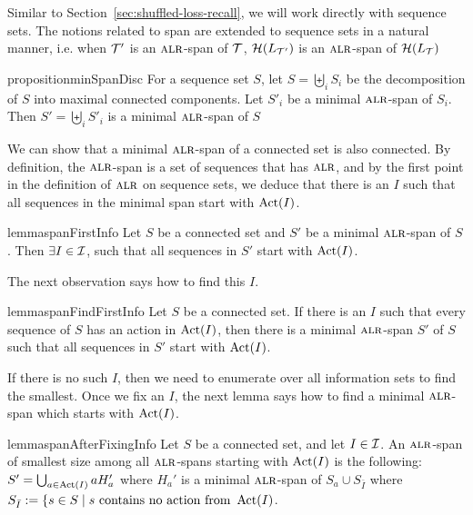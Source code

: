 Similar to Section~\ref{sec:shuffled-loss-recall}, we will work
directly with sequence sets. The notions related to span are extended
to sequence sets in a natural manner, i.e. when $\mathcal{T}'$ is an
$\textsc{alr}$-span of $\mathcal{T}$, $\mathcal{H}(L_{\mathcal{T}'})$ is an $\textsc{alr}$-span of
$\mathcal{H}(L_{\mathcal{T}})$  

\begin{restatable}{proposition}{minSpanDisc}\label{prop:min-span-disconnected}
  For a sequence set $S$, let $S = \biguplus_{i}S_i$ be the
  decomposition of $S$ into maximal connected components. Let $S'_i$
  be a minimal $\textsc{alr}$-span of $S_i$. Then
  $S' = \biguplus_{i}S'_i$ is a minimal $\textsc{alr}$-span of $S$
\end{restatable}

We can show that a minimal $\textsc{alr}$-span of a connected set is also
connected. By definition, the $\textsc{alr}$-span is a set of sequences that
has $\textsc{alr}$, and by the first point in the definition of $\textsc{alr}$ on
sequence sets, we deduce that there is an $I$ such that all sequences
in the minimal span start with $\operatorname{Act}(I)$.

\begin{restatable}{lemma}{spanFirstInfo}\label{lem:span-first-I}
  Let $S$ be a connected set and $S'$ be a minimal $\textsc{alr}$-span of
  $S$. Then $\exists I \in \mathcal{I}$, such that all sequences in $S'$ start
  with $\operatorname{Act}(I)$.
\end{restatable}


The next observation says how to find this $I$. 
\begin{restatable}{lemma}{spanFindFirstInfo}\label{lem:span-finding-first-I}
  Let $S$ be a connected set. If there is an $I$ such that every
  sequence of $S$ has an action in $\operatorname{Act}(I)$, then there is a minimal
  $\textsc{alr}$-span $S'$ of $S$ such that all sequences in $S'$ start with
  $\operatorname{Act}(I)$.
\end{restatable}

If there is no such $I$, then we need to enumerate over all
information sets to find the smallest. Once we fix an $I$, the next
lemma says how to find a minimal $\textsc{alr}$-span which starts with
$\operatorname{Act}(I)$.

\begin{restatable}{lemma}{spanAfterFixingInfo}\label{lem:span-after-fixing-an-I}
  Let $S$ be a connected set, and let $I \in \mathcal{I}$. An $\textsc{alr}$-span of smallest size among all
    $\textsc{alr}$-spans starting with $\operatorname{Act}(I)$ is the following:
    $S' = \bigcup_{a \in \operatorname{Act}(I)}a H_a'$ where $H_a'$ is a minimal
    $\textsc{alr}$-span of $S_a \cup S_{\bar{I}}$ where $S_{\bar{I}} := \{ s
    \in S \mid s \text{ contains no 
      action from } \operatorname{Act}(I)$.
                \end{restatable}







